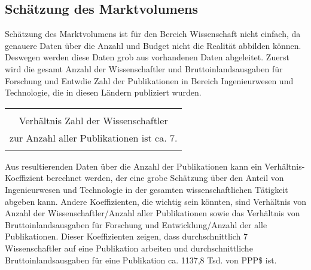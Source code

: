 \subsection{Schätzung des Marktvolumens}
Schätzung des Marktvolumens ist für den Bereich Wissenschaft nicht einfach, da genauere Daten über die Anzahl und Budget nicht die Realität abbilden können. Deswegen werden diese Daten grob aus vorhandenen Daten abgeleitet. Zuerst wird die gesamt Anzahl der Wissenschaftler und Bruttoinlandsausgaben für Forschung und Entwdie Zahl der Publikationen in Bereich Ingenieurwesen und Technologie, die in diesen Ländern publiziert wurden. 
\begin{table}[h!]
  \centering
  \begin{large}
  \begin{tabular}{c}\hline
  \\
  {\color{orange}Verhältnis Zahl der Wissenschaftler}\\
  {\color{orange}zur Anzahl aller Publikationen ist ca. 7.}\\
  \\\hline
  \end{tabular}
  \end{large}
\end{table}
Aus resultierenden Daten über die Anzahl der Publikationen kann ein Verhältnis-Koeffizient berechnet werden, der eine grobe Schätzung über den Anteil von Ingenieurwesen und Technologie in der gesamten wissenschaftlichen Tätigkeit abgeben kann. Andere Koeffizienten, die wichtig sein könnten, sind Verhältnis von Anzahl der Wissenschaftler/Anzahl aller Publikationen sowie das Verhältnis von Bruttoinlandsausgaben für Forschung und Entwicklung/Anzahl der alle Publikationen. Dieser Koeffizienten zeigen, dass durchschnittlich 7 Wissenschaftler auf eine Publikation arbeiten und durchschnittliche Bruttoinlandsausgaben für eine Publikation ca. 1137,8 Tsd. von PPP\$ ist.
